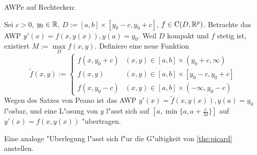 \remark AWPe auf Rechtecken:{
  Sei $c>0$, $y_0\in\mathbb R$, $D:=[a,b]\times[y_0-c,y_0+c]$, 
  $f\in{\rm C}(D,\mathbb R^p)$. Betrachte das AWP $y'(x)=f(x,y(x)), y(a)=y_0$.
  Weil $D$ kompakt und $f$ stetig ist, existiert $M:=\underset D \max f(x,y)$.
  Definiere eine neue Funktion
  \[\tilde f(x,y):=\begin{cases}
      f(x,y_0+c) & (x,y)\in[a,b]\times(y_0+c,\infty) \\
      f(x,y) & (x,y)\in[a,b]\times[y_0-c,y_0+c] \\
      f(x,y_0-c) & (x,y)\in[a,b]\times(-\infty,y_0-c)
      \end{cases}
    \]
  Wegen des Satzes von Peano ist das AWP $y'(x)=\tilde f(x,y(x)),y(a)=y_0$ 
  l"osbar, und eine L"osung von $y$ l"asst sich auf $[a,\min\{a,a+\frac c M\}]$
  auf $y'(x)=f(x,y(x))$ "ubertragen. 
  
  Eine analoge "Uberlegung l"asst sich f"ur die G"ultigkeit von 
  \ref{the:picard} anstellen.
  }

